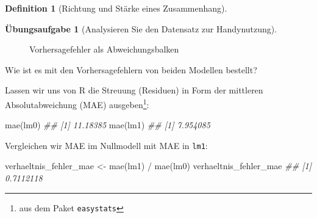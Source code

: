 \documentclass[
  a4paper,
  DIV=11]{scrreprt}
\newenvironment{Shaded}{\begin{snugshade}}{\end{snugshade}}
\newcommand{\DocumentationTok}[1]{\textcolor[rgb]{0.37,0.37,0.37}{\textit{#1}}}
\newcommand{\FunctionTok}[1]{\textcolor[rgb]{0.28,0.35,0.67}{#1}}
\newcommand{\NormalTok}[1]{\textcolor[rgb]{0.00,0.23,0.31}{#1}}
\newcommand{\OtherTok}[1]{\textcolor[rgb]{0.00,0.23,0.31}{#1}}
\newcommand{\SpecialCharTok}[1]{\textcolor[rgb]{0.37,0.37,0.37}{#1}}
\theoremstyle{definition}
\newtheorem{exercise}{Übungsaufgabe}[chapter]
\theoremstyle{definition}
\theoremstyle{definition}
\newtheorem{definition}{Definition}[chapter]
\theoremstyle{remark}
\begin{document}
\begin{definition}[Richtung und Stärke eines
Zusammenhang]
\begin{exercise}[Analysieren Sie den Datensatz zur
Handynutzung]
\begin{figure}
\begin{minipage}{0.50\linewidth}
{}


\end{minipage}%
%
\begin{minipage}{0.50\linewidth}



\end{minipage}%

\caption{\label{fig-resid}Vorhersagefehler als Abweichungsbalken}

\end{figure}%

Wie ist es mit den Vorhersagefehlern von beiden Modellen bestellt?

Lassen wir uns von R die Streuung (Residuen) in Form der mittleren
Absolutabweichung (MAE) ausgeben\footnote{aus dem Paket
  \texttt{easystats}}:

\begin{Shaded}
\begin{Highlighting}[]
\FunctionTok{mae}\NormalTok{(lm0)}
\DocumentationTok{\#\# [1] 11.18385}
\FunctionTok{mae}\NormalTok{(lm1)}
\DocumentationTok{\#\# [1] 7.954085}
\end{Highlighting}
\end{Shaded}

Vergleichen wir MAE im Nullmodell mit MAE in \texttt{lm1}:

\begin{Shaded}
\begin{Highlighting}[]
\NormalTok{verhaeltnis\_fehler\_mae }\OtherTok{\textless{}{-}} \FunctionTok{mae}\NormalTok{(lm1) }\SpecialCharTok{/} \FunctionTok{mae}\NormalTok{(lm0)}
\NormalTok{verhaeltnis\_fehler\_mae}
\DocumentationTok{\#\# [1] 0.7112118}
\end{Highlighting}
\end{Shaded}


\end{exercise}
\end{definition}
\end{document}
